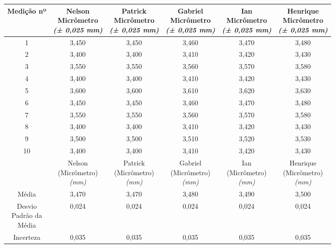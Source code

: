 \documentclass{article}
\begin{document}
\begin{table}[h!]
\centering
\begin{tabular}{c c c c c c }
\toprule
Medição nº & \shortstack{Nelson\\Micrômetro\\\textit{(± 0,025 mm)}} & \shortstack{Patrick\\Micrômetro\\\textit{(± 0,025 mm)}} & \shortstack{Gabriel\\Micrômetro\\\textit{(± 0,025 mm)}} & \shortstack{Ian\\Micrômetro\\\textit{(± 0,025 mm)}} & \shortstack{Henrique\\Micrômetro\\\textit{(± 0,025 mm)}}\\
\midrule
1 & 3,450 & 3,450 & 3,460 & 3,470 & 3,480\\
2 & 3,400 & 3,400 & 3,410 & 3,420 & 3,430\\
3 & 3,550 & 3,550 & 3,560 & 3,570 & 3,580\\
4 & 3,400 & 3,400 & 3,410 & 3,420 & 3,430\\
5 & 3,600 & 3,600 & 3,610 & 3,620 & 3,630\\
6 & 3,450 & 3,450 & 3,460 & 3,470 & 3,480\\
7 & 3,550 & 3,550 & 3,560 & 3,570 & 3,580\\
8 & 3,400 & 3,400 & 3,410 & 3,420 & 3,430\\
9 & 3,500 & 3,500 & 3,510 & 3,520 & 3,530\\
10 & 3,400 & 3,400 & 3,410 & 3,420 & 3,430\\
\midrule
&\shortstack{Nelson\\(Micrômetro)\\\textit{(mm)}} & \shortstack{Patrick\\(Micrômetro)\\\textit{(mm)}} & \shortstack{Gabriel\\(Micrômetro)\\\textit{(mm)}} & \shortstack{Ian\\(Micrômetro)\\\textit{(mm)}} & \shortstack{Henrique\\(Micrômetro)\\\textit{(mm)}}\\
\midrule
Média & 3,470 & 3,470 & 3,480 & 3,490 & 3,500\\[3pt]
\shortstack{Desvio\\Padrão da\\Média} & 0,024 & 0,024 & 0,024 & 0,024 & 0,024\\[3pt]
Incerteza & 0,035 & 0,035 & 0,035 & 0,035 & 0,035\\
\bottomrule
\end{tabular}
\end{table}
\end{document}
